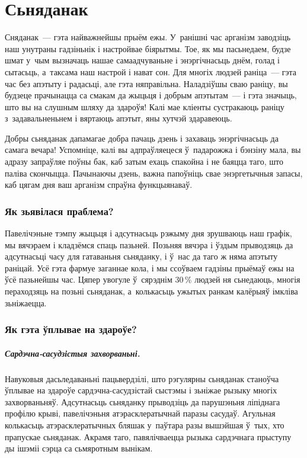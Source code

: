 \chapter{Сьняданак}

Сняданак~--- гэта найважнейшы прыём ежы. У~ранішні час арганізм заводзіць наш унутраны гадзіньнік і настройвае біярытмы. Тое, як мы пасьнедаем, будзе шмат у~чым вызначаць нашае самаадчуваньне і энэргічнасьць днём, голад і сытасьць, а~таксама наш настрой і нават сон. Для многіх людзей раніца~--- гэта час без апэтыту і радасьці, але гэта няправільна. Наладзіўшы сваю раніцу, вы будзеце прачынацца са смакам да жыцьця і добрым апэтытам~--- і гэта значыць, што вы на слушным шляху да здароўя! Калі мае кліенты сустракаюць раніцу з~задавальненьнем і вяртаюць апэтыт, яны хутчэй здаравеюць.

Добры сьняданак дапамагае добра пачаць дзень і захаваць энэргічнасьць да самага вечара! Успомніце, калі вы адпраўляецеся ў~падарожжа і бэнзіну мала, вы адразу запраўляе поўны бак, каб затым ехаць спакойна і не баяцца таго, што паліва скончыцца. Пачынаючы дзень, важна папоўніць свае энэргетычныя запасы, каб цягам дня ваш арганізм спраўна функцыянаваў.


\subsection{Як зьявілася праблема?}
Павелічэньне тэмпу жыцьця і адсутнасьць рэжыму дня зрушваюць наш графік, мы вячэраем і кладзёмся спаць пазьней. Позьняя вячэра і ўздым прыводзяць да адсутнасьці часу для гатаваньня сьняданку, і ў~нас да таго ж няма апэтыту раніцай. Усё гэта фармуе заганнае кола, і мы ссоўваем гадзіны прыёмаў ежы на ўсё пазьнейшы час. Цяпер увогуле ў~сярэднім 30\,\% людзей ня сьнедаюць, многія пераходзяць на позьні сьняданак, а~колькасьць ужытых ранкам калёрыяў імкліва зьніжаецца.

\subsection{Як гэта ўплывае на здароўе?}

\paragraph{Сардэчна-сасудзістыя захворваньні.}
Навуковыя дасьледаваньні пацьвердзілі, што рэгулярны сьняданак станоўча ўплывае на здароўе сардэчна-сасудзістай сыстэмы і зьніжае рызыку многіх захворваньняў. Адсутнасьць сьняданку прыводзіць да парушэньня ліпіднага профілю крыві, павелічэньня атэрасклератычнай паразы сасудаў. Агульная колькасьць атэрасклератычных бляшак у~паўтара разы вышэйшая ў~тых, хто прапускае сьняданак. Акрамя таго, павялічваецца рызыка сардэчнага прыступу ды ішэміі сэрца са сьмяротным вынікам.

